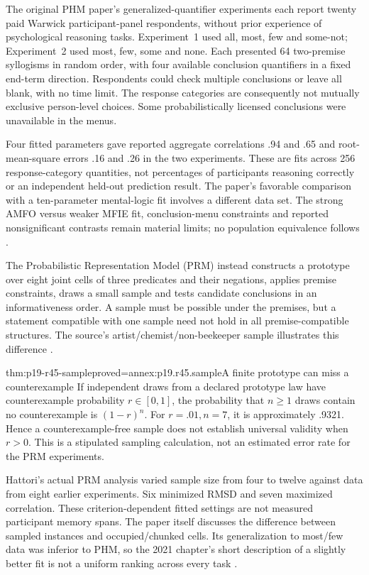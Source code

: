The original PHM paper's generalized-quantifier experiments each
report twenty paid Warwick participant-panel respondents, without prior
experience of psychological reasoning tasks. Experiment~1 used all,
most, few and some-not; Experiment~2 used most, few, some and none.
Each presented 64 two-premise syllogisms in random order, with four
available conclusion quantifiers in a fixed end-term direction.
Respondents could check multiple conclusions or leave all blank, with
no time limit. The response categories are consequently not mutually
exclusive person-level choices. Some probabilistically licensed
conclusions were unavailable in the menus.

Four fitted parameters gave reported aggregate correlations .94 and
.65 and root-mean-square errors .16 and .26 in the two experiments.
These are fits across 256 response-category quantities, not percentages
of participants reasoning correctly or an independent held-out
prediction result. The paper's favorable comparison with a ten-parameter
mental-logic fit involves a different data set. The strong AMFO versus
weaker MFIE fit, conclusion-menu constraints and reported nonsignificant
contrasts remain material limits; no population equivalence follows
\cite[pp.~224--231]{ChaterOaksford1999PHM}.

The Probabilistic Representation Model (PRM) instead constructs a
prototype over eight joint cells of three predicates and their
negations, applies premise constraints, draws a small sample and tests
candidate conclusions in an informativeness order. A sample must be
possible under the premises, but a statement compatible with one
sample need not hold in all premise-compatible structures. The source's
artist/chemist/non-beekeeper sample illustrates this difference
\cite[pp.~288--289]{ChaterOaksford2021BayesianReasoning}.

\begin{hblemma}{thm:p19-r45-sample}{proved=annex:p19.r45.sample}{A finite prototype can miss a counterexample}
If independent draws from a declared prototype law have counterexample
probability \(r\in[0,1]\), the probability that \(n\geq1\)
draws contain no counterexample is \((1-r)^n\).
For \(r=.01,n=7\), it is approximately .9321. Hence a
counterexample-free sample does not establish universal validity when
\(r>0\). This is a stipulated sampling calculation, not an estimated
error rate for the PRM experiments.
\end{hblemma}

Hattori's actual PRM analysis varied sample size from four to twelve
against data from eight earlier experiments. Six minimized RMSD and
seven maximized correlation. These criterion-dependent fitted settings
are not measured participant memory spans. The paper itself discusses
the difference between sampled instances and occupied/chunked cells.
Its generalization to most/few data was inferior to PHM, so the 2021
chapter's short description of a slightly better fit is not a uniform
ranking across every task \cite[pp.~312,315--316]{Hattori2016PRM}.

